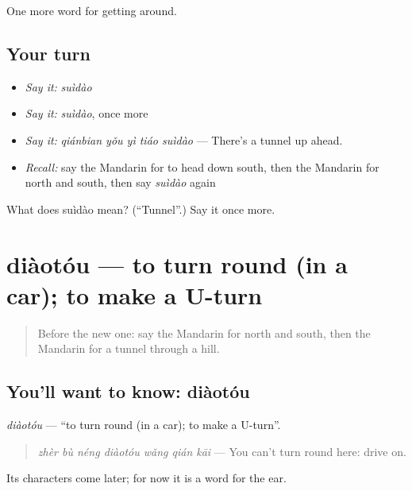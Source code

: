 \begin{grammarlens}[title={What you've built}]
One more word for getting around.
\end{grammarlens}

\subsection*{Your turn}
\begin{itemize}
\raggedright
  \item \emph{Say it:} \emph{suìdào}
  \item \emph{Say it:} \emph{suìdào}, once more
  \item \emph{Say it:} \emph{qiánbian yǒu yì tiáo suìdào} — There's a tunnel up ahead.
  \item \emph{Recall:} say the Mandarin for to head down south, then the Mandarin for north and south, then say \emph{suìdào} again
\end{itemize}

\begin{tcolorbox}[breakable,colback=teal!4,colframe=teal!35!black,title={Before you move on}]
What does suìdào mean? (\textquotedblleft{}Tunnel\textquotedblright{}.) Say it once more.
\end{tcolorbox}
\section[diàotóu]{diàotóu — to turn round (in a car); to make a U-turn}

\label{lesson:ZH-C424-diaotou}



\begin{quote}
Before the new one: say the Mandarin for north and south, then the Mandarin for a tunnel through a hill.
\end{quote}

\subsection*{You'll want to know: diàotóu}
\emph{diàotóu} — \textquotedblleft{}to turn round (in a car); to make a U-turn\textquotedblright{}.

\begin{quote}
\emph{zhèr bù néng diàotóu wǎng qián kāi} — You can't turn round here: drive on.
\end{quote}

Its characters come later; for now it is a word for the ear.

